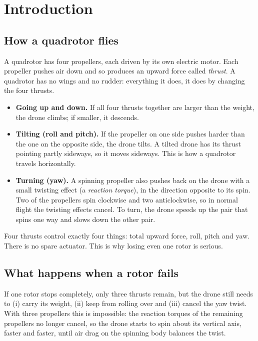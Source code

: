 \section{Introduction}\label{sec:intro}

\subsection{How a quadrotor flies}
A quadrotor has four propellers, each driven by its own electric motor. Each propeller pushes air down and so produces an upward force called \emph{thrust}. A quadrotor has no wings and no rudder: everything it does, it does by changing the four thrusts.
\begin{itemize}
  \item \textbf{Going up and down.} If all four thrusts together are larger than the weight, the drone climbs; if smaller, it descends.
  \item \textbf{Tilting (roll and pitch).} If the propeller on one side pushes harder than the one on the opposite side, the drone tilts. A tilted drone has its thrust pointing partly sideways, so it moves sideways. This is how a quadrotor travels horizontally.
  \item \textbf{Turning (yaw).} A spinning propeller also pushes back on the drone with a small twisting effect (a \emph{reaction torque}), in the direction opposite to its spin. Two of the propellers spin clockwise and two anticlockwise, so in normal flight the twisting effects cancel. To turn, the drone speeds up the pair that spins one way and slows down the other pair.
\end{itemize}
Four thrusts control exactly four things: total upward force, roll, pitch and yaw. There is no spare actuator. This is why losing even one rotor is serious.

\subsection{What happens when a rotor fails}
If one rotor stops completely, only three thrusts remain, but the drone still needs to (i) carry its weight, (ii) keep from rolling over and (iii) cancel the yaw twist. With three propellers this is impossible: the reaction torques of the remaining propellers no longer cancel, so the drone starts to spin about its vertical axis, faster and faster, until air drag on the spinning body balances the twist.

